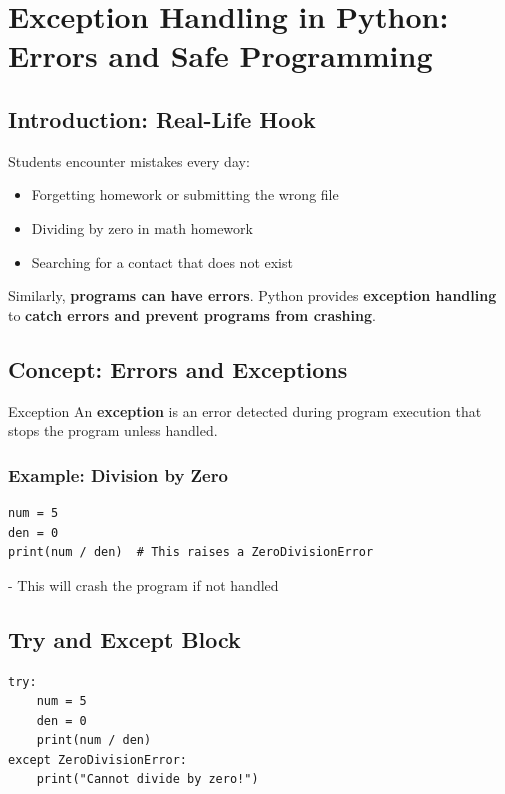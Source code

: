\chapter{Exception Handling in Python: Errors and Safe Programming}

\section{Introduction: Real-Life Hook}

Students encounter mistakes every day:  

\begin{itemize}
    \item Forgetting homework or submitting the wrong file  
    \item Dividing by zero in math homework  
    \item Searching for a contact that does not exist  
\end{itemize}

Similarly, \textbf{programs can have errors}. Python provides \textbf{exception handling} to \textbf{catch errors and prevent programs from crashing}.

\section{Concept: Errors and Exceptions}

\begin{definition}{Exception}
An \textbf{exception} is an error detected during program execution that stops the program unless handled.
\end{definition}

\subsection{Example: Division by Zero}

\begin{verbatim}
num = 5
den = 0
print(num / den)  # This raises a ZeroDivisionError
\end{verbatim}

- This will crash the program if not handled  

\section{Try and Except Block}

\begin{verbatim}
try:
    num = 5
    den = 0
    print(num / den)
except ZeroDivisionError:
    print("Cannot divide by zero!")
\end{verbatim}

